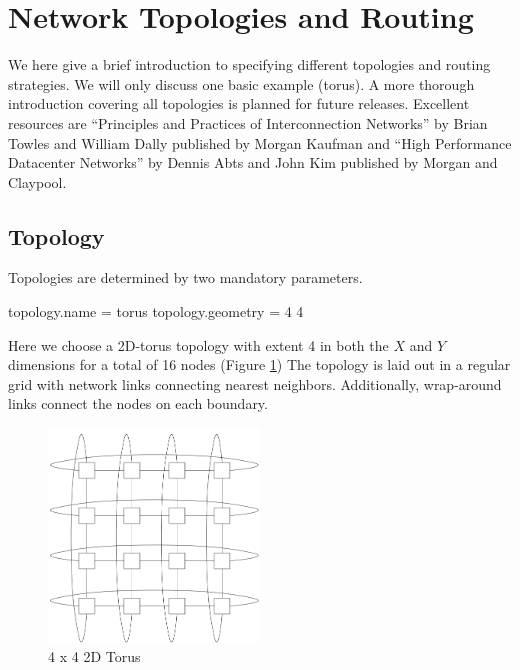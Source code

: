 
\section{Network Topologies and Routing}
\label{sec:tutorial:topology}
We here give a brief introduction to specifying different topologies and routing strategies.  
We will only discuss one basic example (torus).  
A more thorough introduction covering all topologies is planned for future releases.
Excellent resources are ``Principles and Practices of Interconnection Networks'' by Brian Towles and William Dally published by Morgan Kaufman and ``High Performance Datacenter Networks'' by Dennis Abts and John Kim published by Morgan and Claypool.

\subsection{Topology}
\label{subsec:tutorial:topology}

Topologies are determined by two mandatory parameters.

\begin{ViFile}
topology.name = torus
topology.geometry = 4 4
\end{ViFile}
Here we choose a 2D-torus topology with extent 4 in both the $X$ and $Y$ dimensions for a total of 16 nodes (Figure \ref{fig:torus:basic})
The topology is laid out in a regular grid with network links connecting nearest neighbors.  
Additionally, wrap-around links connect the nodes on each boundary.  
\begin{figure}[h]
\centering
\includegraphics[width=0.5\textwidth]{figures/tikz/torus/torus.png}
\caption{4 x 4 2D Torus}
\label{fig:torus:basic}
\end{figure}


